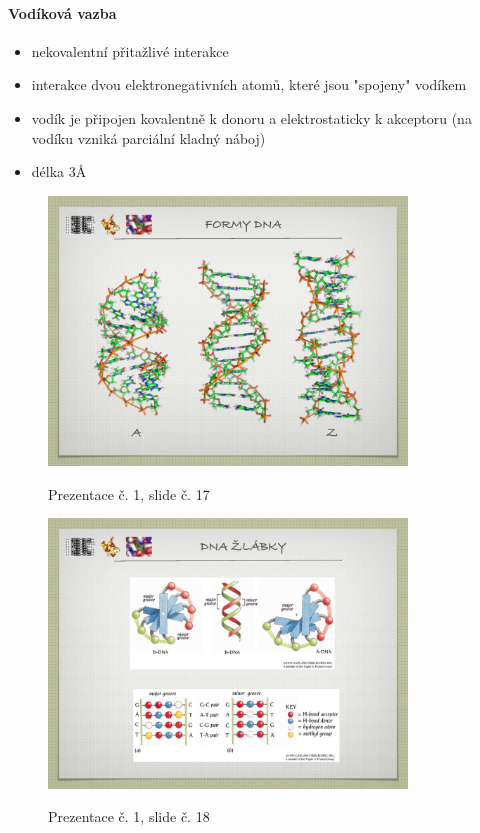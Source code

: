 \documentclass[DIV=8]{scrreprt}
\begin{document}
\paragraph{Vodíková vazba}
\begin{itemize}[nosep]
    \item nekovalentní přitažlivé interakce
    \item interakce dvou elektronegativních atomů, které jsou "spojeny" vodíkem
    \item vodík je připojen kovalentně k donoru a elektrostaticky k akceptoru (na vodíku vzniká parciální kladný náboj)
    \item délka 3Å
\end{itemize}



\begin{figure}
    \caption{Prezentace č. 1, slide č. 17}
    \includegraphics[width=0.85\textwidth]{slides-1/slide-17.jpg}
    \centering
    \label{slides-1-slide-17}
\end{figure}
\begin{figure}
    \caption{Prezentace č. 1, slide č. 18}
    \includegraphics[width=0.85\textwidth]{slides-1/slide-18.jpg}
    \centering
    \label{slides-1-slide-18}
\end{figure}
\end{document}
